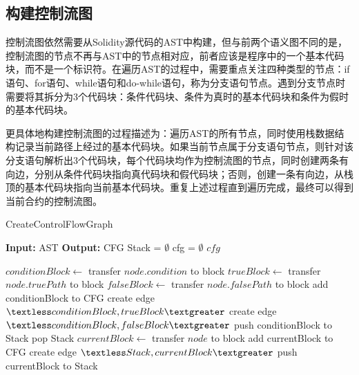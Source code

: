 \subsection{构建控制流图}
\label{sec:构建控制流图}
控制流图依然需要从Solidity源代码的AST中构建，但与前两个语义图不同的是，控制流图的节点不再与AST中的节点相对应，前者应该是程序中的一个基本代码块，而不是一个标识符。在遍历AST的过程中，需要重点关注四种类型的节点：if语句、for语句、while语句和do-while语句，称为分支语句节点。遇到分支节点时需要将其拆分为3个代码块：条件代码块、条件为真时的基本代码块和条件为假时的基本代码块。

更具体地构建控制流图的过程描述为：遍历AST的所有节点，同时使用栈数据结构记录当前路径上经过的基本代码块。如果当前节点属于分支语句节点，则针对该分支语句解析出3个代码块，每个代码块均作为控制流图的节点，同时创建两条有向边，分别从条件代码块指向真代码块和假代码块；否则，创建一条有向边，从栈顶的基本代码块指向当前基本代码块。重复上述过程直到遍历完成，最终可以得到当前合约的控制流图。
\begin{algorithm}
    \caption{CreateControlFlowGraph}
    \begin{algorithmic}[2]
    
    
        \State \textbf{Input:} AST
        \State \textbf{Output:} CFG
        \State Stack = $\emptyset$
        \State cfg = $\emptyset$
        \State {}
        \State \Return $cfg$
    
    
            \State \Return
        \EndIf
            \State $conditionBlock \gets$ transfer $node.condition$ to block
            \State $trueBlock \gets$ transfer $node.truePath$ to block
            \State $falseBlock \gets$ transfer $node.falsePath$ to block
            \State add conditionBlock to CFG
            \State create edge $\textless conditionBlock, trueBlock \textgreater$
            \State create edge $\textless conditionBlock, falseBlock \textgreater$
            \State push conditionBlock to Stack
            \State {}
            \State {}
            \State pop Stack
        \Else
            \State $currentBlock \gets$ transfer $node$ to block
            \State add currentBlock to CFG
                \State create edge $\textless Stack, currentBlock \textgreater$
            \EndIf
            \State push currentBlock to Stack
        \EndIf
            \State {}
        \EndFor
    \EndFunction
    
    \end{algorithmic}
    \end{algorithm}
